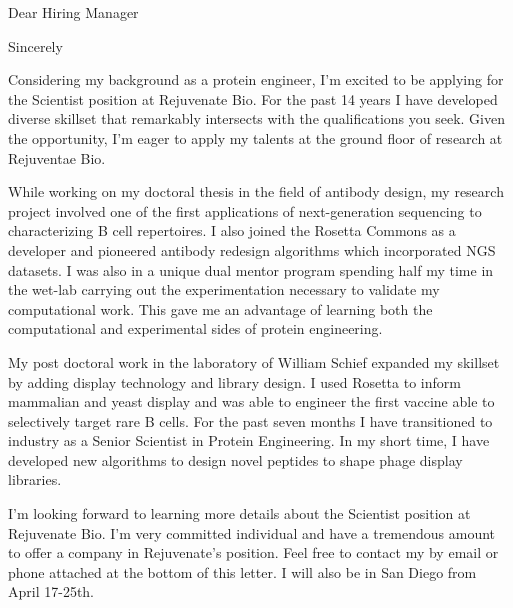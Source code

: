 \documentclass[11pt,a4paper,sans]{moderncv}        %
\title{}                               %
\begin{document}
\date{April 10, 2019}
\opening{Dear Hiring Manager}
\closing{Sincerely}
\makelettertitle


Considering my background as a protein engineer, I’m excited to be applying for the
Scientist position at Rejuvenate Bio. 
For the past 14 years I have developed diverse skillset that remarkably intersects with the qualifications you seek. Given the opportunity, 
I'm eager to apply my talents at the ground floor of research at Rejuventae Bio.

\vspace{0.1in}
While working on my doctoral thesis in the field of antibody design, my research project involved one of the first applications of next-generation 
sequencing to characterizing B cell repertoires.
I also joined the Rosetta Commons as a developer and pioneered antibody redesign algorithms which incorporated NGS datasets. I was also in a unique dual 
mentor program spending half my time in the wet-lab carrying out the experimentation necessary to validate my computational work. This gave me an advantage 
of learning both the computational and experimental sides of protein engineering.

\vspace{0.1in}
My post doctoral work in the laboratory of William Schief expanded my skillset by adding display technology and library design. I used Rosetta to inform 
mammalian and yeast 
display and was able to engineer the first vaccine able to selectively target rare B cells. For the past seven months I have transitioned to industry as a 
Senior Scientist in Protein Engineering. In my short time, I have developed new algorithms to design novel peptides to shape phage display libraries.

\vspace{0.1in}
I’m looking forward to learning more details about the Scientist position at Rejuvenate Bio. I'm very committed individual and have a tremendous amount
 to offer a company in Rejuvenate's position.
Feel free to contact my by email or phone attached at the bottom of this letter. I will also be in San Diego from April 17-25th.


\makeletterclosing
\end{document}
